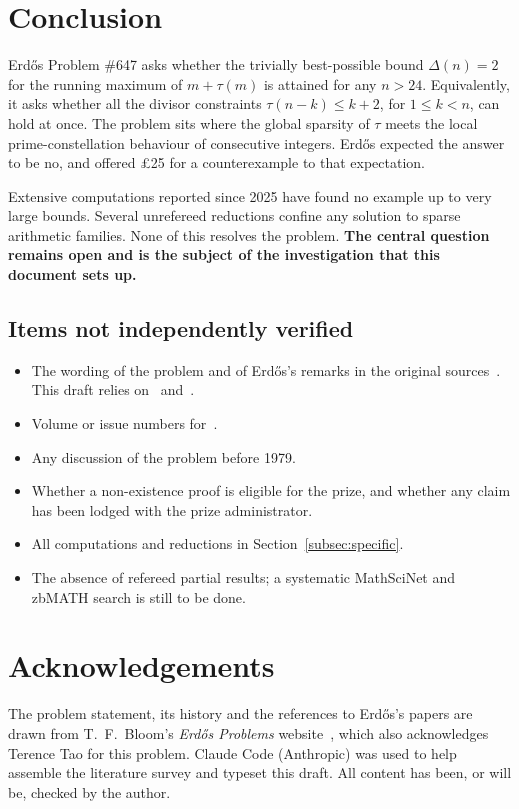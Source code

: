 \documentclass[11pt]{amsart}
\theoremstyle{plain}
\theoremstyle{definition}
\theoremstyle{remark}
\numberwithin{equation}{section}
\newcommand{\Dl}{\Delta}        %
\begin{document}
\section{Conclusion}\label{sec:conclusion}

Erd\H{o}s Problem \#647 asks whether the trivially best-possible bound $\Dl(n)=2$ for the running maximum of $m+\tau(m)$ is attained for any $n>24$. Equivalently, it asks whether all the divisor constraints $\tau(n-k)\le k+2$, for $1\le k<n$, can hold at once. The problem sits where the global sparsity of $\tau$ meets the local prime-constellation behaviour of consecutive integers. Erd\H{o}s expected the answer to be no, and offered \pounds 25 for a counterexample to that expectation.

Extensive computations reported since 2025 have found no example up to very large bounds. Several unrefereed reductions confine any solution to sparse arithmetic families. None of this resolves the problem. \textbf{The central question remains open and is the subject of the investigation that this document sets up.}

\subsection{Items not independently verified}\label{subsec:unverified}
\begin{itemize}
  \item The wording of the problem and of Erd\H{o}s's remarks in the original sources~\cite{Erdos1979MathMag,Erdos1979Acta,Erdos1980Survey,Erdos1992Eureka,Erdos1995Octogon}. This draft relies on~\cite{Bloom647} and~\cite{OEIS_A087280}.
  \item Volume or issue numbers for~\cite{Erdos1979Acta,Erdos1992Eureka,Erdos1995Octogon}.
  \item Any discussion of the problem before 1979.
  \item Whether a non-existence proof is eligible for the prize, and whether any claim has been lodged with the prize administrator.
  \item All computations and reductions in Section~\ref{subsec:specific}.
  \item The absence of refereed partial results; a systematic MathSciNet and zbMATH search is still to be done.
\end{itemize}

\section*{Acknowledgements}
The problem statement, its history and the references to Erd\H{o}s's papers are drawn from T.~F.~Bloom's \emph{Erd\H{o}s Problems} website~\cite{Bloom647}, which also acknowledges Terence Tao for this problem. Claude Code (Anthropic) was used to help assemble the literature survey and typeset this draft. All content has been, or will be, checked by the author.



\end{document}
